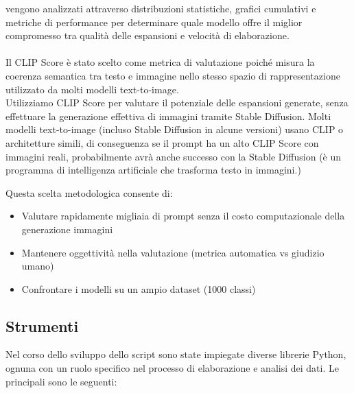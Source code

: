 \documentclass{article}
\begin{document}
vengono analizzati attraverso distribuzioni statistiche, grafici cumulativi 
e metriche di performance per determinare quale modello offre il miglior 
compromesso tra qualità delle espansioni e velocità di elaborazione.
\\\\
Il CLIP Score è stato scelto come metrica di valutazione poiché misura la 
coerenza semantica tra testo e immagine nello stesso spazio di rappresentazione 
utilizzato da molti modelli text-to-image. 
\\
Utilizziamo CLIP Score per valutare il potenziale delle espansioni generate, senza effettuare la generazione effettiva di immagini tramite Stable Diffusion. Molti modelli text-to-image (incluso Stable Diffusion in alcune versioni) usano CLIP o architetture simili, di conseguenza se il prompt ha un alto CLIP Score con immagini reali, probabilmente avrà anche successo con la Stable Diffusion (è un programma di intelligenza artificiale che trasforma testo in immagini.)

Questa scelta metodologica consente di:
\begin{itemize}
    \item Valutare rapidamente migliaia di prompt senza il costo computazionale 
    della generazione immagini
    \item Mantenere oggettività nella valutazione (metrica automatica vs 
    giudizio umano)
    \item Confrontare i modelli su un ampio dataset (1000 classi)
\end{itemize}


\subsection{Strumenti}
Nel corso dello sviluppo dello script sono state impiegate diverse librerie Python, ognuna con un ruolo specifico nel processo di elaborazione e analisi dei dati. Le principali sono le seguenti:
\end{document}
